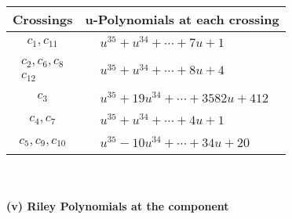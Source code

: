\documentclass[1p]{elsarticle_modified}
\theoremstyle{definition}
\begin{document}
\begin{tabular}{m{50pt}|m{274pt}}
Crossings & \hspace{64pt}u-Polynomials at each crossing \\
\hline $$\begin{aligned}c_{1},c_{11}\end{aligned}$$&$\begin{aligned}
&u^{35}+u^{34}+\cdots+7 u+1
\end{aligned}$\\
\hline $$\begin{aligned}c_{2},c_{6},c_{8}\\c_{12}\end{aligned}$$&$\begin{aligned}
&u^{35}+u^{34}+\cdots+8 u+4
\end{aligned}$\\
\hline $$\begin{aligned}c_{3}\end{aligned}$$&$\begin{aligned}
&u^{35}+19 u^{34}+\cdots+3582 u+412
\end{aligned}$\\
\hline $$\begin{aligned}c_{4},c_{7}\end{aligned}$$&$\begin{aligned}
&u^{35}+u^{34}+\cdots+4 u+1
\end{aligned}$\\
\hline $$\begin{aligned}c_{5},c_{9},c_{10}\end{aligned}$$&$\begin{aligned}
&u^{35}-10 u^{34}+\cdots+34 u+20
\end{aligned}$\\
\hline
\end{tabular}\\~\\
\newpage\renewcommand{\arraystretch}{1}
\flushleft \textbf{(v) Riley Polynomials at the component}\newline \\
\end{document}
